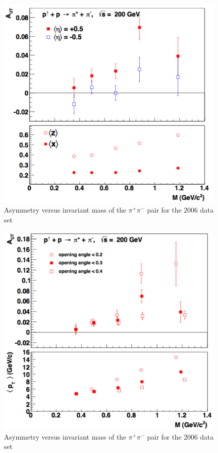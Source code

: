 \documentclass[abstract = on,listof=totoc, bibliography=totoc]{scrreprt}
\newcommand{\pip}{\pi^+}
\newcommand{\pim}{\pi^-}
\newcommand{\pair}{$\pip\pim$ }
\begin{document}
 \begin{figure}
\begin{center}
\includegraphics[width = 1\textwidth]{ansM_new}
\caption[$A_{UT}$ vs Invariant Mass in 2006 data set]{Asymmetry versus invariant mass of the \pair pair for the 2006 data set}
\label{fig:ansM}
\end{center}
\end{figure}

 \begin{figure}
\begin{center}
\includegraphics[width = 1\textwidth]{ansAngles_new}
\caption[$A_{UT}$ for different opening angles]{Asymmetry versus invariant mass of the \pair pair for the 2006 data set}
\label{fig:ansM}
\end{center}
\end{figure}
\end{document}

